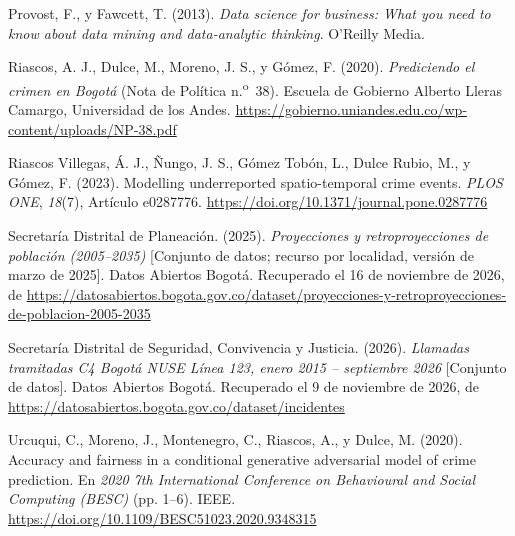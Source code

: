\begin{thebibliography}{}
Provost, F., y Fawcett, T. (2013). \emph{Data science for business: What you need to know about data mining and data-analytic thinking}. O'Reilly Media.

Riascos, A. J., Dulce, M., Moreno, J. S., y Gómez, F. (2020). \emph{Prediciendo el crimen en Bogotá} (Nota de Política n.\textsuperscript{o}~38). Escuela de Gobierno Alberto Lleras Camargo, Universidad de los Andes. \url{https://gobierno.uniandes.edu.co/wp-content/uploads/NP-38.pdf}

Riascos Villegas, Á. J., Ñungo, J. S., Gómez Tobón, L., Dulce Rubio, M., y Gómez, F. (2023). Modelling underreported spatio-temporal crime events. \emph{PLOS ONE}, \emph{18}(7), Artículo e0287776. \url{https://doi.org/10.1371/journal.pone.0287776}

Secretaría Distrital de Planeación. (2025). \emph{Proyecciones y retroproyecciones de población (2005--2035)} [Conjunto de datos; recurso por localidad, versión de marzo de 2025]. Datos Abiertos Bogotá. Recuperado el 16 de noviembre de 2026, de \url{https://datosabiertos.bogota.gov.co/dataset/proyecciones-y-retroproyecciones-de-poblacion-2005-2035}

Secretaría Distrital de Seguridad, Convivencia y Justicia. (2026). \emph{Llamadas tramitadas C4 Bogotá NUSE Línea 123, enero 2015 -- septiembre 2026} [Conjunto de datos]. Datos Abiertos Bogotá. Recuperado el 9 de noviembre de 2026, de \url{https://datosabiertos.bogota.gov.co/dataset/incidentes}

Urcuqui, C., Moreno, J., Montenegro, C., Riascos, A., y Dulce, M. (2020). Accuracy and fairness in a conditional generative adversarial model of crime prediction. En \emph{2020 7th International Conference on Behavioural and Social Computing (BESC)} (pp. 1--6). IEEE. \url{https://doi.org/10.1109/BESC51023.2020.9348315}

\end{thebibliography}
